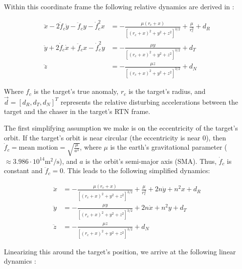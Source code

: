 \documentclass[12pt, letterpaper,titlepage]{article}
\begin{document}
Within this coordinate frame the following relative dynamics are derived in
\cite{sullivan_comprehensive_2017}:

\begin{equation}
    \label{full_dynamics}
    \begin{split}
        \ddot{x} - 2\dot{f}_c\dot{y} - \ddot{f}_c y - \dot{f}_c^2 x & =
            -\frac{\mu(r_c + x)}{\left[ (r_c+x)^2 + y^2 + z^2\right]^{3/2}} +
            \frac{\mu}{r_c^2} + d_R \\
        \ddot{y} + 2\dot{f}_c\dot{x} + \ddot{f}_c x - \dot{f}_c^2 y & =
            -\frac{\mu y}{\left[ (r_c+x)^2 + y^2 + z^2\right]^{3/2}} + d_T \\
        \ddot{z} & = -\frac{\mu z}{\left[ (r_c+x)^2 + y^2 + z^2\right]^{3/2}} +
            d_N
    \end{split}
\end{equation}

Where $f_c$ is the target's true anomaly, $r_c$ is the target's radius, and
$\vec{d} = [d_R, d_T, d_N]^T$ represents the relative disturbing accelerations
between the target and the chaser in the target's RTN frame.

The first simplifying assumption we make is on the eccentricity of the target's
orbit. If the target's orbit is near circular (the eccentricity is near 0),
then $\dot{f}_c = \text{mean motion} = \sqrt{\frac{\mu}{a^3}}$, where $\mu$ is
the earth's gravitational parameter ($\approx 3.986\cdot10^{14} \text{
m}^2/\text{s}$), and $a$ is the orbit's semi-major axis (SMA). Thus,
$\dot{f}_c$ is constant and $\ddot{f}_c = 0$. This leads to the following
simplified dynamics:

\begin{equation}
    \label{circular_dynamics}
    \begin{split}
        \ddot{x} & =
            -\frac{\mu(r_c + x)}{\left[ (r_c+x)^2 + y^2 + z^2\right]^{3/2}} +
            \frac{\mu}{r_c^2} + 2n\dot{y} + n^2 x + d_R \\
        \ddot{y} & = -\frac{\mu y}{\left[ (r_c+x)^2 + y^2 + z^2\right]^{3/2}} +
            2n\dot{x} + n^2 y + d_T \\
        \ddot{z} & = -\frac{\mu z}{\left[ (r_c+x)^2 + y^2 + z^2\right]^{3/2}} +
            d_N
    \end{split}
\end{equation}

Linearizing this around the target's position, we arrive at the
following linear dynamics \cite{cli_clohessy_nodate}:
\end{document}
